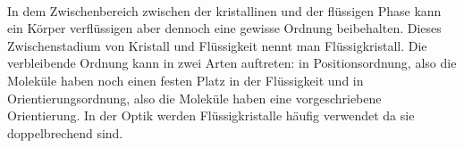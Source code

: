 \documentclass[11pt,a4paper]{article}
\numberwithin{equation}{section}
\numberwithin{figure}{section}
\begin{document}
\\
\begin{addmargin}[25pt]{0pt}     
In dem Zwischenbereich zwischen der kristallinen und der flüssigen Phase kann ein Körper verflüssigen aber dennoch eine gewisse Ordnung beibehalten. Dieses Zwischenstadium von Kristall und Flüssigkeit nennt man Flüssigkristall. Die verbleibende Ordnung kann in zwei Arten auftreten: in Positionsordnung, also die Moleküle haben noch einen festen Platz in der Flüssigkeit und in Orientierungsordnung, also die Moleküle haben eine vorgeschriebene Orientierung. In der Optik werden Flüssigkristalle häufig verwendet da sie doppelbrechend sind.\\
\end{addmargin}
\end{document}
